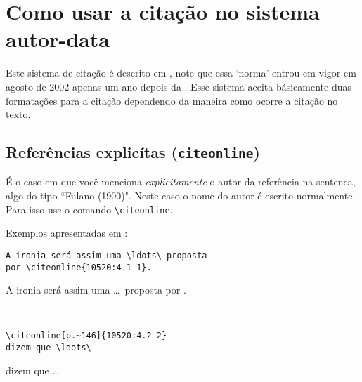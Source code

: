 \documentclass[espacosimples]{abnt}
\newcommand{\VerbL}{0.54\textwidth}
\newcommand{\LatL}{0.45\textwidth}
\begin{document}
\section{Como usar a citação no sistema autor-data}

Este sistema de citação é descrito em , note que
essa `norma' entrou em vigor em agosto de 2002 apenas um ano depois da
.
Esse sistema aceita básicamente duas formatações para a citação
dependendo da maneira como ocorre a citação no texto.

\subsection{Referências explicítas ({\tt citeonline}) }

É o caso em que você menciona \emph{explicitamente} o autor da referência na sentenca, algo
do tipo ``Fulano (1900)". Neste caso o nome do autor é escrito
normalmente. Para isso use o comando \verb+\citeonline+.

Exemplos apresentadas em :


\vspace{3mm}
\noindent\begin{minipage}[t]{\VerbL}\small\begin{verbatim}
A ironia será assim uma \ldots\ proposta
por \citeonline{10520:4.1-1}.
\end{verbatim}\end{minipage}\begin{minipage}[t]{\LatL}\small
A ironia será assim uma \ldots\ proposta 
por .
\end{minipage}\vspace{5mm}\\

\noindent\begin{minipage}[t]{\VerbL}\small\begin{verbatim}
dizem que \ldots\ 
\end{verbatim}\end{minipage}\begin{minipage}[t]{\LatL}\small
\citeonline[p.~146]{10520:4.2-2} dizem que \ldots\
\end{minipage}\vspace{5mm}\\
\end{document}
